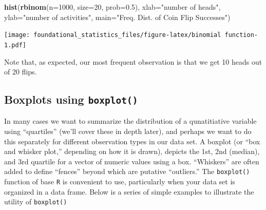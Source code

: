 \documentclass[]{book}
\newenvironment{Shaded}{\begin{snugshade}}{\end{snugshade}}
\newcommand{\CommentTok}[1]{\textcolor[rgb]{0.56,0.35,0.01}{\textit{#1}}}
\newcommand{\DataTypeTok}[1]{\textcolor[rgb]{0.13,0.29,0.53}{#1}}
\newcommand{\DecValTok}[1]{\textcolor[rgb]{0.00,0.00,0.81}{#1}}
\newcommand{\FloatTok}[1]{\textcolor[rgb]{0.00,0.00,0.81}{#1}}
\newcommand{\KeywordTok}[1]{\textcolor[rgb]{0.13,0.29,0.53}{\textbf{#1}}}
\newcommand{\NormalTok}[1]{#1}
\newcommand{\OperatorTok}[1]{\textcolor[rgb]{0.81,0.36,0.00}{\textbf{#1}}}
\newcommand{\StringTok}[1]{\textcolor[rgb]{0.31,0.60,0.02}{#1}}
\begin{document}
\begin{Shaded}
\begin{Highlighting}[]
\KeywordTok{hist}\NormalTok{(}\KeywordTok{rbinom}\NormalTok{(}\DataTypeTok{n=}\DecValTok{1000}\NormalTok{, }\DataTypeTok{size=}\DecValTok{20}\NormalTok{, }\DataTypeTok{prob=}\FloatTok{0.5}\NormalTok{), }\DataTypeTok{xlab=}\StringTok{"number of heads"}\NormalTok{, }\DataTypeTok{ylab=}\StringTok{"number of activities"}\NormalTok{,}
     \DataTypeTok{main=}\StringTok{"Freq. Dist. of Coin Flip Successes"}\NormalTok{)}
\end{Highlighting}
\end{Shaded}

\texttt{[image: foundational\_statistics\_files/figure-latex/binomial function-1.pdf]}

Note that, as expected, our most frequent observation is that we get 10 heads out of 20 flips.

\hypertarget{boxplots-using-boxplot}{%
\subsection{\texorpdfstring{Boxplots using \texttt{boxplot()}}{Boxplots using boxplot()}}\label{boxplots-using-boxplot}}

In many cases we want to summarize the distribution of a qunatitiative variable using ``quartiles'' (we'll cover these in depth later), and perhaps we want to do this separately for different observation types in our data set. A boxplot (or ``box and whisker plot,'' depending on how it is drawn), depicts the 1st, 2nd (median), and 3rd quartile for a vector of numeric values using a box. ``Whiskers'' are often added to define ``fences'' beyond which are putative ``outliers.'' The \texttt{boxplot()} function of base \texttt{R} is convenient to use, particularly when your data set is organized in a data frame. Below is a series of simple examples to illustrate the utility of \texttt{boxplot()}

\begin{Shaded}
\end{Shaded}
\end{document}
